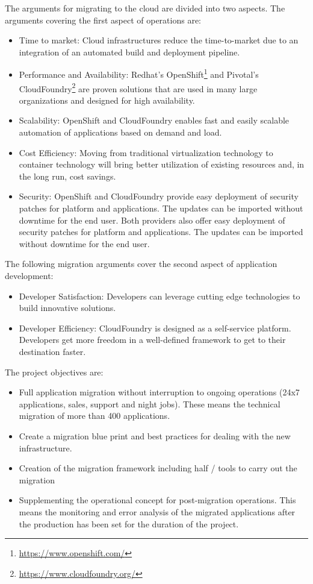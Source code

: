 The arguments for migrating to the cloud are divided into two aspects. The arguments covering the first aspect of operations are:
\begin{itemize}
    \item Time to market: Cloud infrastructures reduce the time-to-market due to an integration of an automated build and deployment pipeline.
    \item Performance and Availability: Redhat's OpenShift\footnote{\url{https://www.openshift.com/}} and Pivotal's CloudFoundry\footnote{\url{https://www.cloudfoundry.org/}} are proven solutions that are used in many large organizations and designed for high availability.
    \item Scalability: OpenShift and CloudFoundry enables fast and easily scalable automation of applications based on demand and load.
    \item Cost Efficiency: Moving from traditional virtualization technology to container technology will bring better utilization of existing resources and, in the long run, cost savings.
    \item Security: OpenShift and CloudFoundry provide easy deployment of security patches for platform and applications. The updates can be imported without downtime for the end user. Both providers also offer easy deployment of security patches for platform and applications. The updates can be imported without downtime for the end user.
\end{itemize}
The following migration arguments cover the second aspect of application development:
\begin{itemize}
    \item Developer Satisfaction: Developers can leverage cutting edge technologies to build innovative solutions.
    \item Developer Efficiency: CloudFoundry is designed as a self-service platform. Developers get more freedom in a well-defined framework to get to their destination faster.
\end{itemize}

The project objectives are:
\begin{itemize}
    \item Full application migration without interruption to ongoing operations (24x7 applications, sales, support and night jobs). These means the technical migration of more than 400 applications.
    \item Create a migration blue print and best practices for dealing with the new infrastructure.
    \item Creation of the migration framework including half / tools to carry out the migration
    \item Supplementing the operational concept for post-migration operations. This means the monitoring and error analysis of the migrated applications after the production has been set for the duration of the project.
\end{itemize}

